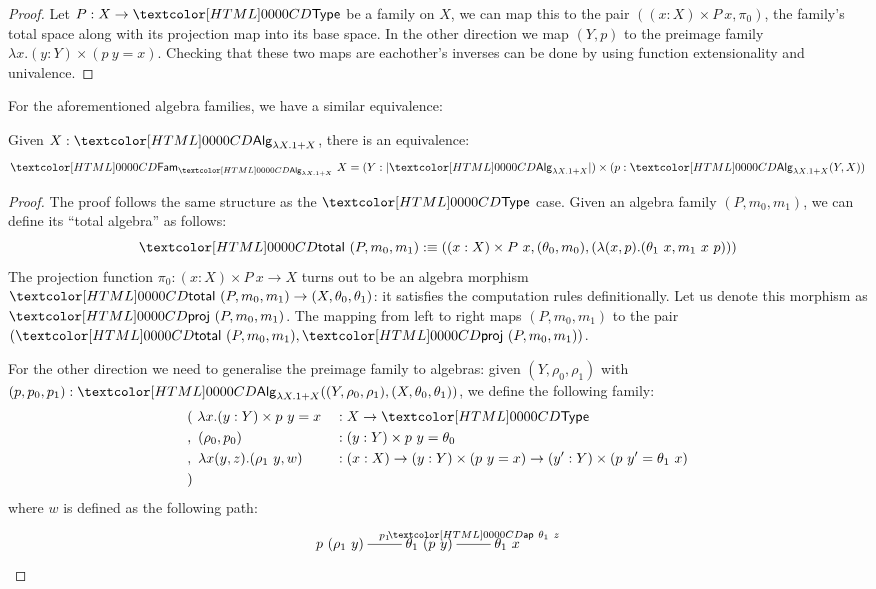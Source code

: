 \begin{proof}
  Let $P : X \to \Type$ be a family on $X$, we can map this to the
  pair $((x : X) \times P\ x, \pi_0)$, \ie the family's total space
  along with its projection map into its base space. In the other
  direction we map $(Y,p)$ to the preimage family
  $\lambda x . (y : Y) \times (p\ y = x)$. Checking that these two
  maps are eachother's inverses can be done by using function
  extensionality and univalence.
\end{proof}

For the aforementioned algebra families, we have a similar
equivalence:

\begin{proposition}
Given $X : \Alg_{\lambda X . 1 + X}$, there is an equivalence:
$$
\Fam_{\Alg_{\lambda X . 1 + X}}\ X = (Y : | \Alg_{\lambda X . 1 +
  X} |) \times (p : \Alg_{\lambda X . 1 + X}(Y,X))
$$
\end{proposition}

\begin{proof}
  The proof follows the same structure as the $\Type$ case. Given an
  algebra family $(P,m_0,m_1)$, we can define its ``total algebra'' as
  follows:
  $$
  \total\ (P,m_0,m_1) \ddefeq ((x : X) \times P\ x , (\theta_0, m_0), (\lambda (x,p) . (\theta_1\ x, m_1\ x\ p)))
  $$
  The projection function $\pi_0 : (x : X) \times P\ x \to X$ turns
  out to be an algebra morphism
  $\total\ (P,m_0,m_1) \to (X,\theta_0,\theta_1)$: it satisfies the
  computation rules definitionally. Let us denote this morphism as
  $\proj\ (P,m_0,m_1)$. The mapping from left to right maps
  $(P,m_0,m_1)$ to the pair
  $(\total\ (P,m_0,m_1), \proj\ (P,m_0,m_1))$.

  For the other direction we need to generalise the preimage family to
  algebras: given $(Y,\rho_0,\rho_1)$ with
  $(p,p_0,p_1) : \Alg_{\lambda X . 1 +
    X}((Y,\rho_0,\rho_1),(X,\theta_0,\theta_1))$,
  we define the following family:
  \begin{align*}
  &(\ \lambda x . (y : Y) \times p\ y = x &&: X \to \Type \\
  &,\ (\rho_0 , p_0) &&: (y : Y) \times p\ y = \theta_0 \\
  &,\ \lambda x (y,z) . (\rho_1\ y , w) &&: (x : X) \to (y : Y) \times (p\ y = x) \to (y' : Y) \times (p\ y' = \theta_1\ x)\\
  &)
  \end{align*}
  where $w$ is defined as the following path:
  $$
  \xymatrix{
    p\ (\rho_1\ y) \ar@{-}[r]^-{p_1} &\theta_1\ (p\ y) \ar@{-}^-{\ap\ \theta_1\ z}[r] &\theta_1\ x
  }
  $$
\end{proof}

